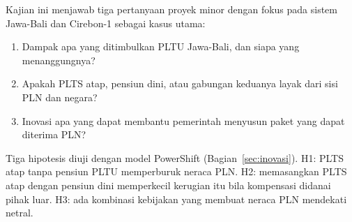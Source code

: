 Kajian ini menjawab tiga pertanyaan proyek minor dengan fokus pada sistem Jawa-Bali dan Cirebon-1 sebagai kasus utama:
\begin{enumerate}
  \item Dampak apa yang ditimbulkan PLTU Jawa-Bali, dan siapa yang menanggungnya?
  \item Apakah PLTS atap, pensiun dini, atau gabungan keduanya layak dari sisi PLN dan negara?
  \item Inovasi apa yang dapat membantu pemerintah menyusun paket yang dapat diterima PLN?
\end{enumerate}
Tiga hipotesis diuji dengan model PowerShift (Bagian~\ref{sec:inovasi}). H1: PLTS atap tanpa pensiun PLTU memperburuk neraca PLN. H2: memasangkan PLTS atap dengan pensiun dini memperkecil kerugian itu bila kompensasi didanai pihak luar. H3: ada kombinasi kebijakan yang membuat neraca PLN mendekati netral.
